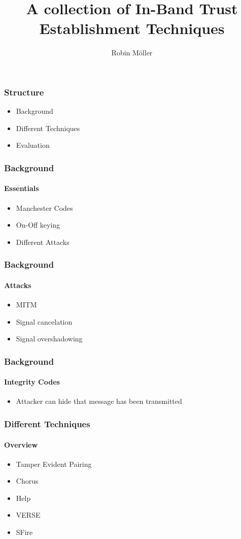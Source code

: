 \documentclass{beamer}
\title{A collection of In-Band Trust Establishment Techniques}
\author{Robin Möller}
\institute[]{Technical University Munich}
\begin{document}
\begin{frame}
\titlepage
\end{frame}

\begin{frame}
\frametitle{Structure}
\begin{itemize}
	\item Background
	\item Different Techniques
	\item Evaluation
\end{itemize}
\end{frame}

\begin{frame}
	\frametitle{Background}
	\framesubtitle{Essentials}
	\begin{itemize}
		\item Manchester Codes
		\item On-Off keying
		\item Different Attacks
	\end{itemize}
\end{frame}

\begin{frame}
	\frametitle{Background}
	\framesubtitle{Attacks}
	\begin{itemize}
		\item MITM
		\item Signal cancelation
		\item Signal overshadowing
	\end{itemize}
\end{frame}

\begin{frame}
	\frametitle{Background}
	\framesubtitle{Integrity Codes}
	\begin{itemize}
		\item Attacker can hide that message has been transmitted
	\end{itemize}
\end{frame}

\begin{frame}
	\frametitle{Different Techniques}
	\framesubtitle{Overview}
	\begin{itemize}
		\item Tamper Evident Pairing
		\item Chorus
		\item Help
		\item VERSE
		\item SFire
	\end{itemize}
\end{frame}
\end{document}
